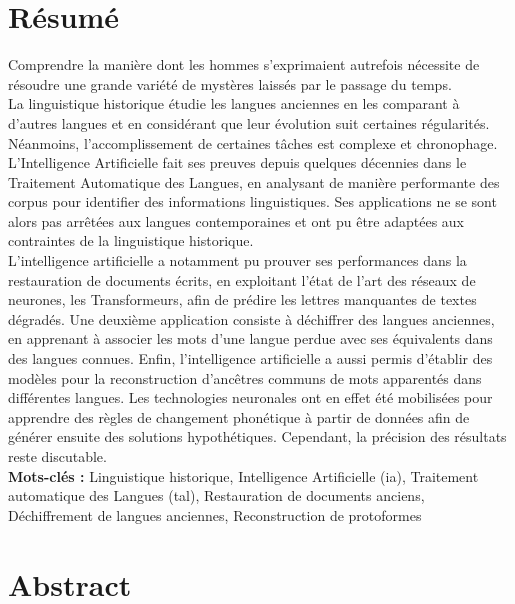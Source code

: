 \documentclass[12pt, twoside]{report}
\begin{document}
\null
\setcounter{page}{1}
\thispagestyle{empty}
\newpage %
\section*{Résumé}
Comprendre la manière dont les hommes s’exprimaient autrefois nécessite de résoudre une grande variété de mystères laissés par le passage du temps.\\ 

La linguistique historique étudie les langues anciennes en les comparant à d’autres langues et en considérant que leur évolution suit certaines régularités. Néanmoins, l’accomplissement de certaines tâches est complexe et chronophage.\\
\indent L’Intelligence Artificielle fait ses preuves depuis quelques décennies dans le Traitement Automatique des Langues, en analysant de manière performante des corpus pour identifier des informations linguistiques. Ses applications ne se sont alors pas arrêtées aux langues contemporaines et ont pu être adaptées aux contraintes de la linguistique historique.\\
\indent L’intelligence artificielle a notamment pu prouver ses performances dans la restauration de documents écrits, en exploitant l’état de l’art des réseaux de neurones, les Transformeurs, afin de prédire les lettres manquantes de textes dégradés. Une deuxième application consiste à déchiffrer des langues anciennes, en apprenant à associer les mots d’une langue perdue avec ses équivalents dans des langues connues. Enfin, l’intelligence artificielle a aussi permis d'établir des modèles pour la reconstruction d’ancêtres communs de mots apparentés dans différentes langues. Les technologies neuronales ont en effet été mobilisées pour apprendre des règles de changement phonétique à partir de données afin de générer ensuite des solutions hypothétiques. Cependant, la précision des résultats reste discutable.\\

\textbf{Mots-clés :} Linguistique historique, Intelligence Artificielle (\Gls{ia}), Traitement automatique des Langues (\Gls{tal}), Restauration de documents anciens, Déchiffrement de langues anciennes, Reconstruction de \glspl{protoforme}

\section*{Abstract}
\end{document}
